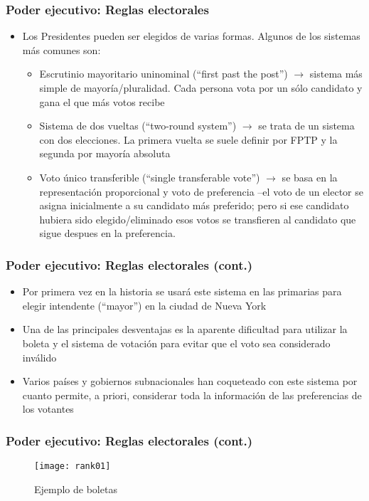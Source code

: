 \documentclass[14pt,aspectratio=169]{beamer}
\begin{document}
  
  \begin{frame}\frametitle{Poder ejecutivo: Reglas electorales}
  \begin{itemize}
  \item Los Presidentes pueden ser elegidos de varias formas. Algunos
    de los sistemas más comunes son:
    \begin{itemize}
      \item Escrutinio mayoritario uninominal (``first past the
        post'') $\longrightarrow$ sistema más simple de
        mayoría/pluralidad. Cada persona vota por un sólo candidato y
        gana el que más votos recibe
    \item Sistema de dos vueltas (``two-round system'')
      $\longrightarrow$ se trata de un sistema con dos elecciones. La
      primera vuelta se suele definir por FPTP y la segunda por
      mayoría absoluta
      \item Voto único transferible (``single transferable vote'')
        $\longrightarrow$ se basa en la representación proporcional y
        voto de preferencia --el voto de un elector se asigna
        inicialmente a su candidato más preferido; pero si ese
        candidato hubiera sido elegido/eliminado esos votos se
        transfieren al candidato que sigue despues en la preferencia.
      \end{itemize}
    \end{itemize}
  \end{frame}


  \begin{frame}\frametitle{Poder ejecutivo: Reglas electorales (cont.)}
  \begin{itemize}\itemsep 15pt
  \item Por primera vez en la historia se usará este sistema en las
    primarias para elegir intendente (``mayor'') en la ciudad de Nueva
    York
    \item Una de las principales desventajas es la aparente dificultad
      para utilizar la boleta y el sistema de votación para evitar que
      el voto sea considerado inválido
      \item Varios países y gobiernos subnacionales han coqueteado con
        este sistema por cuanto permite, a priori, considerar toda la
        información de las preferencias de los votantes
    \end{itemize}
  \end{frame}


 \begin{frame}\frametitle{Poder ejecutivo: Reglas electorales (cont.)}
  \begin{figure}[htbp]\vspace{0cm}
    \centering
    \texttt{[image: rank01]}
    \caption{Ejemplo de boletas}
    \label{fig:1}
  \end{figure}
  \end{frame}
\end{document}
